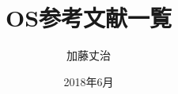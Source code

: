 \documentclass[a4j,10pt,oneside,openany]{jsbook}
\title{OS参考文献一覧}
\author{加藤丈治}
\date{2018年6月}
\begin{document}
%
%
\maketitle
\frontmatter           %
\tableofcontents       %
\mainmatter
\nocite{*}
 
 
\end{document}
